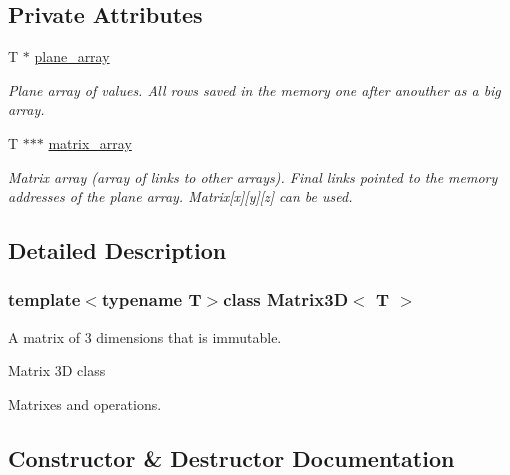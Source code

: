 \subsection*{Private Attributes}
\begin{DoxyCompactItemize}
\item 
\hypertarget{class_matrix3_d_a941588b52adf01fa34315353b6cc1562}{}T $\ast$ \hyperlink{class_matrix3_d_a941588b52adf01fa34315353b6cc1562}{plane\+\_\+array}\label{class_matrix3_d_a941588b52adf01fa34315353b6cc1562}

\begin{DoxyCompactList}\small\item\em Plane array of values. All rows saved in the memory one after anouther as a big array. \end{DoxyCompactList}\item 
\hypertarget{class_matrix3_d_acc0bc67386b5720a8b894374934662fb}{}T $\ast$$\ast$$\ast$ \hyperlink{class_matrix3_d_acc0bc67386b5720a8b894374934662fb}{matrix\+\_\+array}\label{class_matrix3_d_acc0bc67386b5720a8b894374934662fb}

\begin{DoxyCompactList}\small\item\em Matrix array (array of links to other arrays). Final links pointed to the memory addresses of the plane array. Matrix\mbox{[}x\mbox{]}\mbox{[}y\mbox{]}\mbox{[}z\mbox{]} can be used. \end{DoxyCompactList}\end{DoxyCompactItemize}


\subsection{Detailed Description}
\subsubsection*{template$<$typename T$>$class Matrix3\+D$<$ T $>$}

A matrix of 3 dimensions that is immutable. 

Matrix 3\+D class

Matrixes and operations. 

\subsection{Constructor \& Destructor Documentation}
\hypertarget{class_matrix3_d_a1e257f12f4c8aa2477de663544ecce4e}{}
